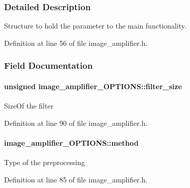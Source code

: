 \subsubsection{Detailed Description}
Structure to hold the parameter to the main functionality. 

Definition at line 56 of file image\-\_\-amplifier.\-h.



\subsubsection{Field Documentation}
\hypertarget{a00002_aa81fa5511538092f08167cbd38091c2f}{
\paragraph[{filter\-\_\-size}]{\setlength{\rightskip}{0pt plus 5cm}unsigned image\-\_\-amplifier\-\_\-\-O\-P\-T\-I\-O\-N\-S\-::filter\-\_\-size}}\label{a00002_aa81fa5511538092f08167cbd38091c2f}
Size\-Of the filter 

Definition at line 90 of file image\-\_\-amplifier.\-h.

\hypertarget{a00002_aa6925bbe38cfca63e79e7d2ea8847396}{
\paragraph[{method}]{ image\-\_\-amplifier\-\_\-\-O\-P\-T\-I\-O\-N\-S\-::method}}\label{a00002_aa6925bbe38cfca63e79e7d2ea8847396}
Type of the preprocessing 

Definition at line 85 of file image\-\_\-amplifier.\-h.

